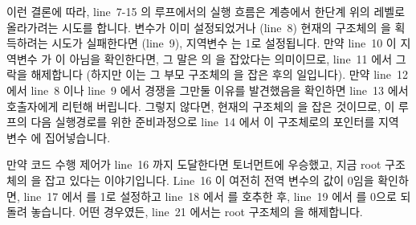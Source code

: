 이런 결론에 따라, line~7-15 의 루프에서의 실행 흐름은  계층에서
한단계 위의 레벨로 올라가려는 시도를 합니다.
 변수가 이미 설정되었거나 (line~8) 현재의  구조체의
 을 획득하려는 시도가 실패한다면 (line~9), 지역변수  는
1로 설정됩니다.
만약 line~10 이 지역변수  가  이 아님을 확인한다면, 그
말은  의  을 잡았다는 의미이므로, line~11 에서 그
락을 해제합니다 (하지만 이는 그 부모  구조체의  을
잡은 후의 일입니다).
만약 line~12 에서 line~8 이나 line~9 에서 경쟁을 그만둘 이유를 발견했음을
확인하면 line~13 에서 호출자에게 리턴해 버립니다.
그렇지 않다면, 현재의  구조체의  을 잡은 것이므로,
이 루프의 다음 실행경로를 위한 준비과정으로 line~14 에서 이 구조체로의 포인터를
지역 변수  에 집어넣습니다.

만약 코드 수행 제어가 line~16 까지 도달한다면 토너먼트에 우승했고, 지금 root
 구조체의  을 잡고 있다는 이야기입니다.
Line~16 이 여전히  전역 변수의 값이 0임을 확인하면, line~17 에서
 를 1로 설정하고 line~18 에서  를
호추한 후, line~19 에서  를 0으로 되돌려 놓습니다.
어떤 경우였든, line~21 에서는 root  구조체의  을
해제합니다.

